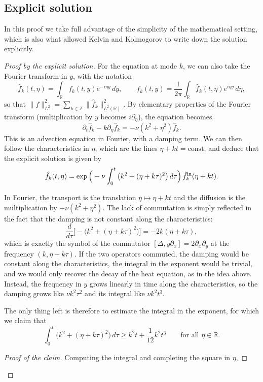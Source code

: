 \documentclass[11pt]{article}
\makeatletter
\theoremstyle{definition}
\theoremstyle{remark}
\newenvironment{note}[1][Note]{\begin{tcolorbox}[ed@note]\noindent{\itshape#1\@addpunct{.}}\enspace\ignorespaces}{\end{tcolorbox}}
\makeatother
\begin{document}
\subsection{Explicit solution}
In this proof we take full advantage of the simplicity of the mathematical setting, which is also what allowed Kelvin and Kolmogorov to write down the solution explicitly.
\begin{proof}[Proof by the explicit solution]\label{proof-couette-explicit}
For the equation at mode $k$, we can also take the Fourier transform in $y$, with the notation
\[\hat f_k(t,\eta)=\int_{\mathbb{R}}f_k(t,y)e^{-i\eta y}\,dy,\qquad f_k(t,y)=\frac{1}{2\pi}\int_{\mathbb{R}}\hat f_k(t,\eta)e^{i\eta y}\,d\eta,\]
so that $\|f\|_{L^2}^2=\sum_{k\in\mathbb{Z}}\|\hat f_k\|_{L^2(\mathbb{R})}^2$. By elementary properties of the Fourier transform (multiplication by $y$ becomes $i\partial_\eta$), the equation becomes
\[\partial_t\hat f_k-k\partial_\eta\hat f_k=-\nu(k^2+\eta^2)\hat f_k.\]
This is an advection equation in Fourier, with a damping term. We can then follow the characteristics in $\eta$, which are the lines $\eta+kt=\text{const}$, and deduce that the explicit solution is given by
\[\hat f_k(t,\eta)=\exp\Big(-\nu\int_0^t\big(k^2+(\eta+k\tau)^2\big)\,d\tau\Big)\,\hat f^{\rm in}_k(\eta+kt).\]
\begin{note}[Where the non-commutation enters]
In Fourier, the transport is the translation $\eta\mapsto\eta+kt$ and the diffusion is the multiplication by $-\nu(k^2+\eta^2)$. The lack of commutation is simply reflected in the fact that the damping is not constant along the characteristics:
\[\frac{d}{d\tau}\Big[-\big(k^2+(\eta+k\tau)^2\big)\Big]=-2k(\eta+k\tau),\]
which is exactly the symbol of the commutator $[\Delta,y\partial_x]=2\partial_x\partial_y$ at the frequency $(k,\eta+k\tau)$. If the two operators commuted, the damping would be constant along the characteristics, the integral in the exponent would be trivial, and we would only recover the decay of the heat equation, as in the idea above. Instead, the frequency in $y$ grows linearly in time along the characteristics, so the damping grows like $\nu k^2\tau^2$ and its integral like $\nu k^2t^3$.
\end{note}
The only thing left is therefore to estimate the integral in the exponent, for which we claim that
\[\int_0^t\big(k^2+(\eta+k\tau)^2\big)\,d\tau\geq k^2t+\frac{1}{12}k^2t^3\qquad\text{for all }\eta\in\mathbb{R}.\]
\begin{proof}[Proof of the claim]\label{proof-couette-explicit-claim}
Computing the integral and completing the square in $\eta$,

\end{proof}
\end{proof}
\end{document}

